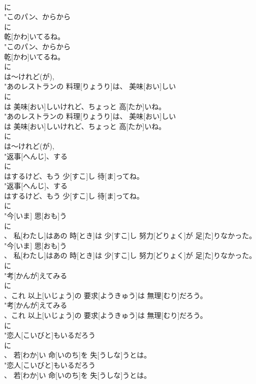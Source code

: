 \documentclass[8pt]{extreport}
\begin{document}
\begin{CJK}{UTF8}{min}
\\	に
\\	"このパン、からから
\\	に
\\	乾[かわ]いてるね。
\\	"このパン、からから
\\	乾[かわ]いてるね。
\\	に
\\	は～けれど(が), 
\\	"あのレストランの 料理[りょうり]は、 美味[おい]しい
\\	に
\\	は 美味[おい]しいけれど、ちょっと 高[たか]いね。
\\	"あのレストランの 料理[りょうり]は、 美味[おい]しい
\\	は 美味[おい]しいけれど、ちょっと 高[たか]いね。
\\	に
\\	は～けれど(が), 
\\	"返事[へんじ]、する
\\	に
\\	はするけど、もう 少[すこ]し 待[ま]ってね。
\\	"返事[へんじ]、する
\\	はするけど、もう 少[すこ]し 待[ま]ってね。
\\	に
\\	"今[いま] 思[おも]う
\\	に
\\	、 私[わたし]はあの 時[とき]は 少[すこ]し 努力[どりょく]が 足[た]りなかった。
\\	"今[いま] 思[おも]う
\\	、 私[わたし]はあの 時[とき]は 少[すこ]し 努力[どりょく]が 足[た]りなかった。
\\	に
\\	"考[かんが]えてみる
\\	に
\\	、これ 以上[いじょう]の 要求[ようきゅう]は 無理[むり]だろう。
\\	"考[かんが]えてみる
\\	、これ 以上[いじょう]の 要求[ようきゅう]は 無理[むり]だろう。
\\	に
\\	"恋人[こいびと]もいるだろう
\\	に
\\	、 若[わか]い 命[いのち]を 失[うしな]うとは。
\\	"恋人[こいびと]もいるだろう
\\	、 若[わか]い 命[いのち]を 失[うしな]うとは。

\end{CJK}
\end{document}
